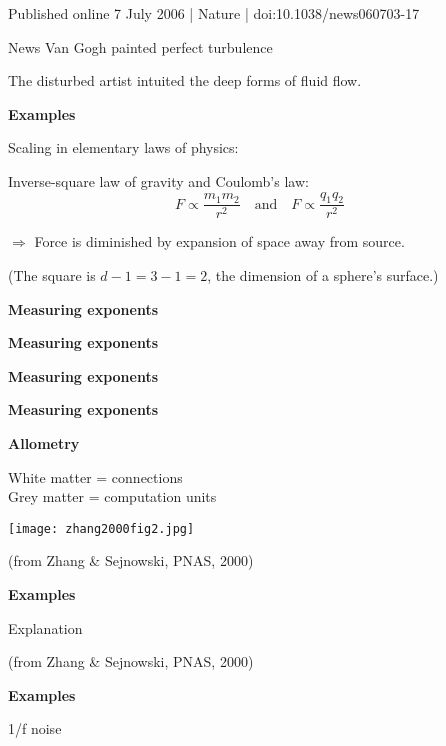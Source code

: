 

  

Published online 7 July 2006 | Nature | doi:10.1038/news060703-17

News
Van Gogh painted perfect turbulence

The disturbed artist intuited the deep forms of fluid flow.



  \textbf{Examples}

  Scaling in elementary laws of physics:

  Inverse-square law of gravity
  and Coulomb's law: 
  $$F \propto \frac{m_1 m_2}{r^{2}}
  \quad \mbox{and} \quad
  F \propto \frac{q_1 q_2}{r^{2}}$$

  $\Rightarrow$ Force is diminished by expansion of
  space away from source.  

  (The square is $d-1=3-1=2$, the dimension of
  a sphere's surface.)





  \textbf{Measuring exponents}

  \textbf{Measuring exponents}

  \textbf{Measuring exponents}

  \textbf{Measuring exponents}




  \textbf{Allometry}

  White matter = connections\\
  Grey matter = computation units

  \begin{center}
    \texttt{[image: zhang2000fig2.jpg]}  
  \end{center}

  \hfill{\tiny(from Zhang \& Sejnowski, PNAS, 2000)}


  \textbf{Examples}

  Explanation

  \hfill{\tiny(from Zhang \& Sejnowski, PNAS, 2000)}



  \textbf{Examples}

  1/f noise







